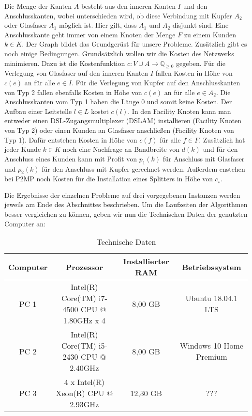 \documentclass[11pt,a4paper]{article}
\newcommand{\Q}{\mathbb{Q}}
\theoremstyle{my_th_style1}
\begin{document}
Die Menge der Kanten $A$ besteht aus den inneren Kanten $I$ und den Anschlusskanten, wobei unterschieden wird, ob diese Verbindung mit Kupfer $A_2$ oder Glasfaser $A_1$ möglich ist. Hier gilt, dass $A_1$ und $A_2$ disjunkt sind. 
Eine Anschlusskante geht immer von einem Knoten der Menge $F$ zu einem Kunden $k \in K$.
Der Graph bildet das Grundgerüst für unsere Probleme. Zusätzlich gibt es noch einige Bedingungen. Grundsätzlich wollen wir die Kosten des Netzwerks minimieren. 
Dazu ist die Kostenfunktion $c: V \cup A \rightarrow \Q_{\geq 0}$ gegeben.
Für die Verlegung von Glasfaser auf den inneren Kanten $I$ fallen Kosten in Höhe von $c(e)$ an für alle $e \in I$. 
Für die Verlegung von Kupfer auf den Anschlusskanten von Typ 2 fallen ebenfalls Kosten in Höhe von $c(e)$ an für alle $e \in A_2$. 
Die  Anschlusskanten vom Typ 1 haben die Länge 0 und somit keine Kosten.
Der Aufbau einer Leitstelle $ l\in L$ kostet $c(l)$. 
In den Facility Knoten kann man entweder einen DSL-Zugangsmultiplexer (DSLAM) installieren (Facility Knoten von Typ 2) oder einen Kunden an Glasfaser anschließen (Facility Knoten von Typ 1). Dafür entstehen Kosten in Höhe von $c(f)$ für alle $f \in F$.
Zusätzlich hat jeder Kunde \(k \in K\) noch eine Nachfrage an Bandbreite von $d(k)$ und für den Anschluss eines Kunden kann mit Profit von $p_1(k)$ für Anschluss mit Glasfaser und $p_2(k)$ für den Anschluss mit Kupfer gerechnet werden. Außerdem enstehen bei P2MP noch Kosten für die Installation eines Splitters in H\"ohe von $c_s$.

Die Ergebnisse der einzelnen Probleme auf drei vorgegebenen Instanzen werden jeweils am Ende des Abschnittes beschrieben.
Um die Laufzeiten der Algorithmen besser vergleichen zu können, geben wir nun die Technischen Daten der genutzten Computer an:
\begin{table}[h]
	\centering
	\begin{tabular}{|c|c|c|c|}
		\hline
		Computer & Prozessor & Installierter RAM & Betriebssystem \\	
		\hline
		PC 1 &Intel(R) Core(TM) i7-4500 CPU @ 1.80GHz x 4 & 8,00 GB & Ubuntu 18.04.1 LTS\\
		PC 2 & Intel(R) Core(TM) i5-2430 CPU @ 2.40GHz & 8,00 GB & Windows 10 Home Premium\\
		PC 3 & 4 x Intel(R) Xeon(R) CPU @ 2.93GHz  & 12,30 GB & ???\\
		\hline 
	\end{tabular}
	\caption{Technische Daten} 
\end{table}
\end{document}

